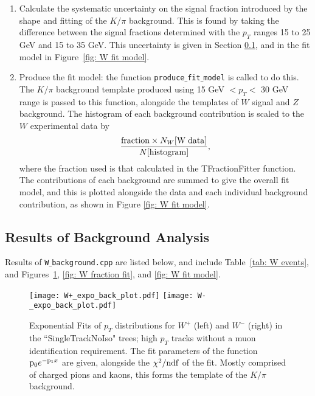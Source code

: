 \documentclass[a4paper,12pt]{article}
\begin{document}
\begin{enumerate}
    \item Calculate the systematic uncertainty on the signal fraction introduced by the shape and fitting of the $K/\pi$ background. This is found by taking the difference between the signal fractions determined with the $p_T$ ranges 15 to 25 GeV and 15 to 35 GeV. This uncertainty is given in Section \ref{sec: W background results}, and in the fit model in Figure~\ref{fig: W fit model}.

    \item Produce the fit model: the function \texttt{produce$\_$fit$\_$model} is called to do this. The $K/\pi$ background template produced using 15 GeV $< p_T <$ 30 GeV range is passed to this function, alongside the templates of $W$ signal and $Z$ background. The histogram of each background contribution is scaled to the $W$ experimental data by
    \begin{equation}
        \frac{{\rm fraction} \times N_W[{\rm W \; data}]}{N[{\rm histogram}]},
    \end{equation}
    where the fraction used is that calculated in the TFractionFitter function.
    The contributions of each background are summed to give the overall fit model, and this is plotted alongside the data and each individual background contribution, as shown in Figure \ref{fig: W fit model}.
\end{enumerate}



\subsection{Results of Background Analysis} \label{sec: W background results}
Results of \texttt{W$\_$background.cpp} are listed below, and include Table~\ref{tab: W events}, and Figures~\ref{fig: W exp back fit}, \ref{fig: W fraction fit}, and \ref{fig: W fit model}.

\begin{figure*}[ht]
  \centering
  \texttt{[image: W+\_expo\_back\_plot.pdf]}
  \texttt{[image: W-\_expo\_back\_plot.pdf]} \hspace{3mm}
  \vspace{-4mm}
  \caption{\small Exponential Fits of $p_T$ distributions for $W^+$ (left) and $W^-$ (right) in the ``SingleTrackNoIso" trees; high $p_T$ tracks without a muon identification requirement.
  The fit parameters of the function ${\rm p}_0e^{-{\rm p}_1x}$ are given, alongside the $\chi^2/{\rm ndf}$ of the fit. Mostly comprised of charged pions and kaons, this forms the template of the $K/\pi$ background.} 
  
  \label{fig: W exp back fit}
\end{figure*}
\end{document}
